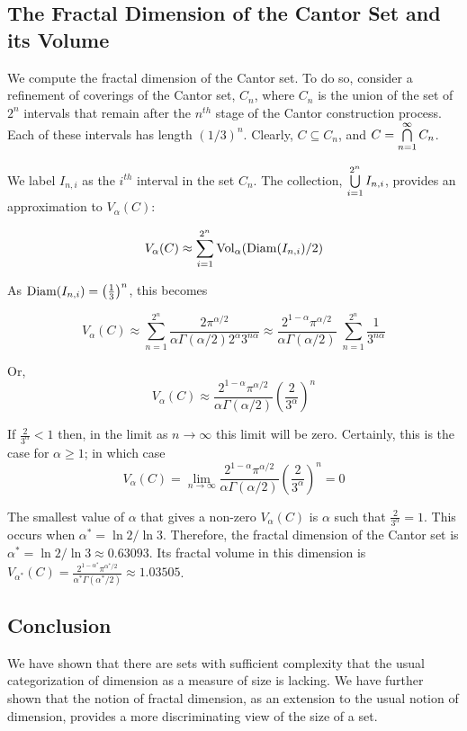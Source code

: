 \subsection{The Fractal Dimension of the Cantor Set and its Volume}
We compute the fractal dimension of the Cantor set. To do so, 
consider a refinement of coverings of the Cantor set, $C_n$, where
$C_n$ is the union of the set of $2^n$ intervals that remain after 
the $n^{th}$ stage of the Cantor construction process. Each of these 
intervals has length $(1/3)^n$. 
Clearly, $C \subseteq C_n$, and $C = \bigcap_{n=1}^\infty\limits C_n$. 

We label $I_{n,i}$ as the $i^{th}$ interval in the set
$C_n$. The collection, $\bigcup_{i=1}^{2^n}\limits I_{n,i}$, provides an
approximation to $V_\alpha(C)$:


$$
V_\alpha(C) \approx \sum_{i=1}^{2^n} {\rm Vol}_\alpha({\rm
  Diam}(I_{n,i}) / 2)
$$

As ${\rm Diam}(I_{n,i}) = \left(\frac{1}{3}\right)^n$, this becomes


$$
V_\alpha(C) \approx \sum_{n=1}^{2^n} \frac{2
  \pi^{\alpha/2}}{ \alpha \Gamma(\alpha/2) 2^\alpha 3^{n\alpha}} 
  \approx  \frac{
  2^{1 - \alpha} \pi^{\alpha/2}}{\alpha \Gamma(\alpha/2)} \;
  \sum_{n=1}^{2^n}  
\frac{1}{3^{n\alpha}}
$$

Or, 
$$
V_\alpha(C) \approx \frac{ 2^{1-\alpha} \pi^{\alpha/2}}{\alpha
  \Gamma(\alpha/2)} \left(\frac{2}{3^\alpha}\right)^n
$$


If $\frac{2}{3^\alpha} < 1$ then, in the limit as 
$n \rightarrow \infty$ 
this limit will be zero. Certainly,
this is the case for $\alpha \ge 1$; in which case 
$$
V_\alpha(C) =  \lim_{n \rightarrow \infty}  \frac{ 2^{1-\alpha} 
\pi^{\alpha/2}}{\alpha
  \Gamma(\alpha/2)} \left(\frac{2}{3^\alpha}\right)^n = 0 
$$

The smallest value of $\alpha$ that gives a non-zero $V_\alpha(C)$ 
is $\alpha$ such that $\frac{2}{3^\alpha} = 1$. 
This occurs when
$\alpha^* = \ln 2 / \ln 3$. Therefore, the fractal dimension of the
Cantor set is $\alpha^* = \ln 2 / \ln 3 \approx 0.63093$. 
Its fractal volume in this
dimension is $V_{\alpha^*}(C) =  \frac{2^{1-\alpha^*} 
\pi^{\alpha^*/2}}{\alpha^*
\Gamma(\alpha^* / 2)} \approx 1.03505 $.

\subsection{Conclusion}
We have shown that there are sets with sufficient complexity that the
usual categorization of dimension as a measure of size is lacking. 
We have further shown
that the notion of fractal dimension, as an extension to the usual
notion of dimension, provides a more discriminating view of the size
of a set.


